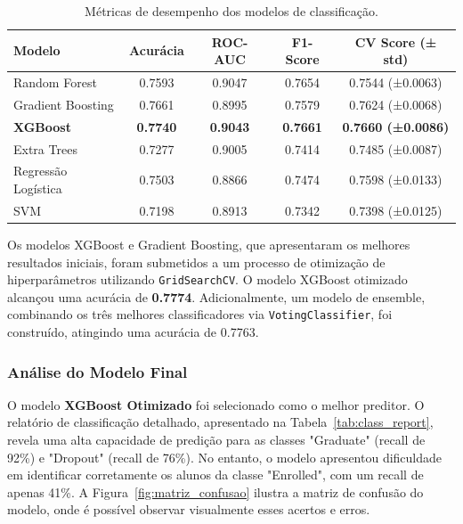 \documentclass[12pt]{article}
\begin{document}
\begin{table}[h!]
\centering
\caption{Métricas de desempenho dos modelos de classificação.}
\label{tab:modelos}
\begin{tabular}{@{}lcccc@{}}
\toprule
\textbf{Modelo} & \textbf{Acurácia} & \textbf{ROC-AUC} & \textbf{F1-Score} & \textbf{CV Score (± std)} \\
\midrule
Random Forest      & 0.7593 & 0.9047 & 0.7654 & 0.7544 (±0.0063) \\
Gradient Boosting  & 0.7661 & 0.8995 & 0.7579 & 0.7624 (±0.0068) \\
\textbf{XGBoost}   & \textbf{0.7740} & \textbf{0.9043} & \textbf{0.7661} & \textbf{0.7660 (±0.0086)} \\
Extra Trees        & 0.7277 & 0.9005 & 0.7414 & 0.7485 (±0.0087) \\
Regressão Logística & 0.7503 & 0.8866 & 0.7474 & 0.7598 (±0.0133) \\
SVM                & 0.7198 & 0.8913 & 0.7342 & 0.7398 (±0.0125) \\
\bottomrule
\end{tabular}
\end{table}

Os modelos XGBoost e Gradient Boosting, que apresentaram os melhores resultados iniciais, foram submetidos a um processo de otimização de hiperparâmetros utilizando \texttt{GridSearchCV}. O modelo XGBoost otimizado alcançou uma acurácia de \textbf{0.7774}. Adicionalmente, um modelo de ensemble, combinando os três melhores classificadores via \texttt{VotingClassifier}, foi construído, atingindo uma acurácia de 0.7763.

\subsubsection{Análise do Modelo Final}
O modelo \textbf{XGBoost Otimizado} foi selecionado como o melhor preditor. O relatório de classificação detalhado, apresentado na Tabela~\ref{tab:class_report}, revela uma alta capacidade de predição para as classes "Graduate" (recall de 92\%) e "Dropout" (recall de 76\%). No entanto, o modelo apresentou dificuldade em identificar corretamente os alunos da classe "Enrolled", com um recall de apenas 41\%. A Figura~\ref{fig:matriz_confusao} ilustra a matriz de confusão do modelo, onde é possível observar visualmente esses acertos e erros.
\end{document}
